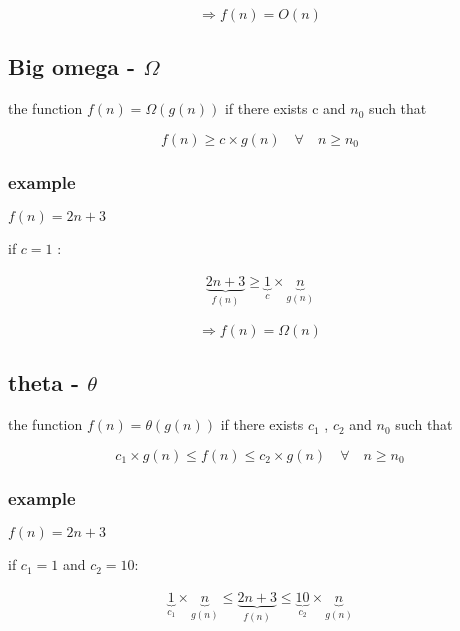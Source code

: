 \documentclass[12pt]{article}
\begin{document}
$$
\Rightarrow f(n) = O(n)
$$


\subsection{Big omega - $\Omega$}


\begin{tcolorbox}
the function
$f(n) = \Omega(g(n))$
if there exists 
c and $n_{0}$
such that 

$$
f(n) \geq c \times g(n) \quad \forall \quad n \geq n_{0}
$$
\end{tcolorbox}




\subsubsection{example}


$f(n) = 2n + 3$

if $c = 1$ :

\begin{align*}
\underbrace{2n+3}_{f(n)} \geq \underbrace{1}_{c} \times \underbrace{n}_{g(n)} 
\end{align*}

$$
\Rightarrow f(n) = \Omega(n)
$$





\subsection{theta - $\theta$}


\begin{tcolorbox}
the function
$f(n) = \theta(g(n))$
if there exists 
$c_{1}$ , $c_{2}$ and $n_{0}$
such that 

$$
c_{1} \times g(n) \leq f(n) \leq c_{2} \times g(n) \quad \forall \quad n \geq n_{0}
$$
\end{tcolorbox}



\subsubsection{example}


$f(n) = 2n + 3$

if $c_{1} = 1$ and  $c_{2} = 10$:

\begin{align*}
\underbrace{1}_{c_{1}} \times \underbrace{n}_{g(n)}  \leq  \underbrace{2n+3}_{f(n)} \leq \underbrace{10}_{c_{2}} \times \underbrace{n}_{g(n)} 
\end{align*}
\end{document}
